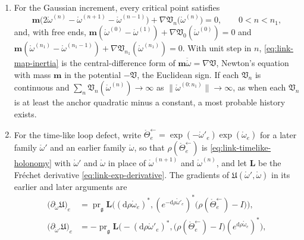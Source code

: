 \begin{enumerate}
\item[(a)] For the Gaussian increment, every critical point satisfies
\begin{equation}
\mathbf m\bigl(2\mathring\omega^{(n)}-\mathring\omega^{(n+1)}-\mathring\omega^{(n-1)}\bigr)+\nabla\mathfrak V_n\bigl(\mathring\omega^{(n)}\bigr)=0,
\qquad 0<n<n_1,
\label{eq:link-map-inertia}
\end{equation}
and, with free ends,
$\mathbf m(\mathring\omega^{(0)}-\mathring\omega^{(1)})+\nabla\mathfrak V_0(\mathring\omega^{(0)})=0$ and
$\mathbf m(\mathring\omega^{(n_1)}-\mathring\omega^{(n_1-1)})+\nabla\mathfrak V_{n_1}(\mathring\omega^{(n_1)})=0$.
With unit step in $n$, \eqref{eq:link-map-inertia} is the central-difference form of
$\mathbf m\ddot{\mathring\omega}=\nabla\mathfrak V$, Newton's equation with mass $\mathbf m$ in the
potential $-\mathfrak V$, the Euclidean sign. If each $\mathfrak V_n$ is continuous and
$\sum_n\mathfrak V_n(\mathring\omega^{(n)})\to\infty$ as
$\lVert\mathring\omega^{(0:n_1)}\rVert\to\infty$, as when each $\mathfrak V_n$ is at least the anchor
quadratic minus a constant, a most probable history exists.
\item[(b)] For the time-like loop defect, write
$\mathring\Theta^{\leftarrow}_e=\exp(-\mathring\omega'_e)\exp(\mathring\omega_e)$ for a later family
$\mathring\omega'$ and an earlier family $\mathring\omega$, so that $\rho(\mathring\Theta^{\leftarrow}_e)$ is
\eqref{eq:link-timelike-holonomy} with $\mathring\omega'$ and $\mathring\omega$ in place of
$\mathring\omega^{(n+1)}$ and $\mathring\omega^{(n)}$, and let $\mathbf L$ be the Fr\'echet derivative
\eqref{eq:link-exp-derivative}. The gradients of $\mathfrak U(\mathring\omega',\mathring\omega)$ in its
earlier and later arguments are
\begin{equation}
\begin{aligned}
\bigl(\partial_{\mathring\omega}\mathfrak U\bigr)_e&=\operatorname{pr}_{\mathfrak g}\mathbf L\bigl((\mathrm d\rho\mathring\omega_e)^*,(e^{-\mathrm d\rho\mathring\omega'_e})^*\bigl(\rho(\mathring\Theta^{\leftarrow}_e)-I\bigr)\bigr),\\
\bigl(\partial_{\mathring\omega'}\mathfrak U\bigr)_e&=-\operatorname{pr}_{\mathfrak g}\mathbf L\bigl(-(\mathrm d\rho\mathring\omega'_e)^*,\bigl(\rho(\mathring\Theta^{\leftarrow}_e)-I\bigr)(e^{\mathrm d\rho\mathring\omega_e})^*\bigr),
\end{aligned}
\label{eq:link-timelike-gradients}
\end{equation}

\end{enumerate}
